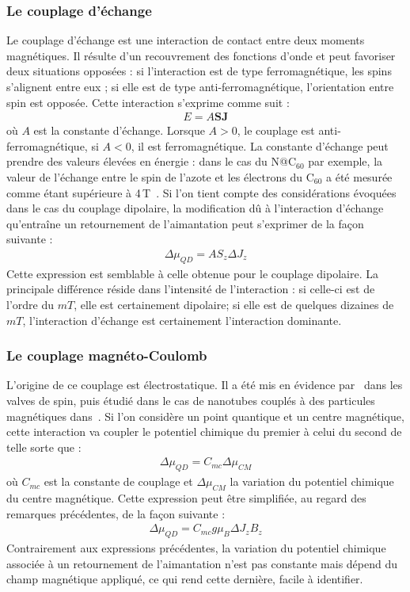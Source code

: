 \subsubsection{Le couplage d'échange}
Le couplage d'échange est une interaction de contact entre deux moments magnétiques. Il résulte d'un recouvrement des fonctions d'onde et peut favoriser deux situations opposées : si l'interaction est de type ferromagnétique, les spins s'alignent entre eux ; si elle est de type anti-ferromagnétique, l'orientation entre spin est opposée. Cette interaction s'exprime comme suit :
\begin{eqnarray}
E = A\mathbf{SJ} \nonumber
\end{eqnarray}
où $A$ est la constante d'échange. Lorsque $A>0$, le couplage est anti-ferromagnétique, si $A<0$, il est ferromagnétique. La constante d'échange peut prendre des valeurs élevées en énergie : dans le cas du N@C$_{60}$ par exemple, la valeur de l'échange entre le spin de l'azote et les électrons du C$_{60}$ a été mesurée comme étant supérieure à 4\,T~\cite{Roch2011}. Si l'on tient compte des considérations évoquées dans le cas du couplage dipolaire, la modification d\^u à l'interaction d'échange qu’entraîne un retournement de l'aimantation peut s'exprimer de la façon suivante :
\begin{eqnarray}
\Delta \mu_{QD} = AS_z\Delta J_z\nonumber
\end{eqnarray}
Cette expression est semblable à celle obtenue pour le couplage dipolaire. La principale différence réside dans l'intensité de l'interaction : si celle-ci est de l'ordre du $mT$, elle est certainement dipolaire; si elle est de quelques dizaines de $mT$, l'interaction d'échange est certainement l'interaction dominante.

\subsubsection{Le couplage magnéto-Coulomb}
L'origine de ce couplage est électrostatique. Il a été mis en évidence par~\cite{Molen2006} dans les valves de spin, puis étudié dans le cas de nanotubes couplés à des particules magnétiques dans~\cite{Datta2011}. Si l'on considère un point quantique et un centre magnétique, cette interaction va coupler le potentiel chimique du premier à celui du second de telle sorte que :
\begin{eqnarray}
\Delta \mu_{QD} = C_{mc} \Delta \mu_{CM}
\end{eqnarray}
où $C_{mc}$ est la constante de couplage et $\Delta \mu_{CM}$ la variation du potentiel chimique du centre magnétique. Cette expression peut être simplifiée, au regard des remarques précédentes, de la façon suivante :
\begin{eqnarray}
\Delta \mu_{QD} = C_{mc} g \mu_B  \Delta J_z B_z
\end{eqnarray}
Contrairement aux expressions précédentes, la variation du potentiel chimique associée à un retournement de l'aimantation n'est pas constante mais dépend du champ magnétique appliqué, ce qui rend cette dernière, facile à identifier.


